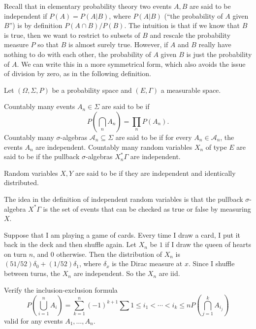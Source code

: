 \begin{subsec}
Recall that in elementary probability theory two events $A,B$ are said to be independent if $P(A) = P(A|B)$, where $P(A|B)$ (``the probability of $A$ given $B$'') is by definition $P(A \cap B)/P(B)$.
The intuition is that if we know that $B$ is true, then we want to restrict to subsets of $B$ and rescale the probability measure $P$ so that $B$ is almost surely true.
However, if $A$ and $B$ really have nothing to do with each other, the probability of $A$ given $B$ is just the probability of $A$.
We can write this in a more symmetrical form, which also avoids the issue of division by zero, as in the following definition.
\end{subsec}

\begin{definition}
Let $(\Omega, \Sigma, P)$ be a probability space and $(E, \Gamma)$ a measurable space.

Countably many events $A_{n} \in \Sigma$ are said to be  if
\[P\left(\bigcap_{n} A_{n}\right) = \prod_{n} P(A_{n}).\]
Countably many $\sigma$-algebras $\mathcal A_{n} \subseteq \Sigma$ are said to be  if for every $A_{n} \in \mathcal A_{n}$, the events $A_{n}$ are independent.
Countably many random variables $X_{n}$ of type $E$ are said to be  if the pullback $\sigma$-algebras $X_{n}^{*}\Gamma$ are independent.

Random variables $X,Y$ are said to be  if they are independent and identically distributed.
\end{definition}

\begin{subsec}
The idea in the definition of independent random variables is that the pullback $\sigma$-algebra $X^{*}\Gamma$ is the set of events that can be checked as true or false by measuring $X$.
\end{subsec}

\begin{example}
Suppose that I am playing a game of cards.
Every time I draw a card, I put it back in the deck and then shuffle again.
Let $X_{n}$ be $1$ if I draw the queen of hearts on turn $n$, and $0$ otherwise.
Then the distribution of $X_{n}$ is $(51/52)\delta_{0} + (1/52)\delta_{1}$, where $\delta_{x}$ is the Dirac measure at $x$.
Since I shuffle between turns, the $X_{n}$ are independent.
So the $X_{n}$ are iid.
\end{example}

\begin{exercise}
Verify the inclusion-exclusion formula
\[P\left(\bigcup_{i=1}^{n} A_{i}\right) = \sum_{k=1}^{n} {(-1)}^{k+1} \sum{1 \leq i_{1} < \cdots < i_{k} \leq n} P\left(\bigcap_{j=1}^{k} A_{i_{j}}\right)\]
valid for any events $A_{1}, \dots, A_{n}$.
\end{exercise}

